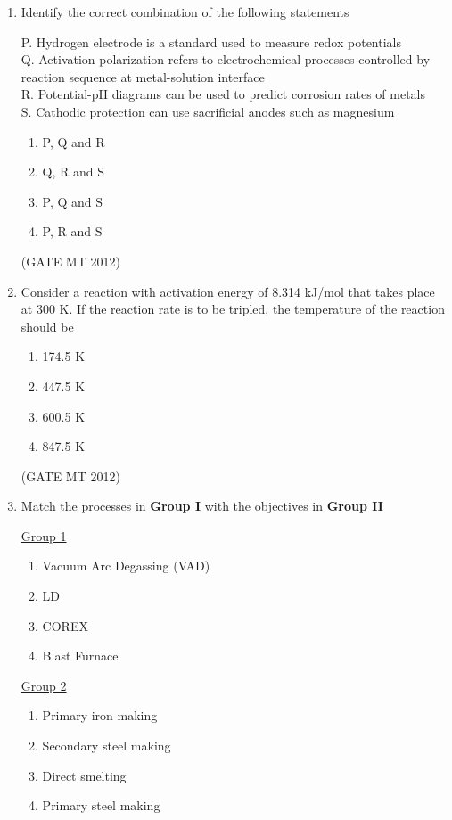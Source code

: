 \documentclass[journal, 11pt, onecolumn]{IEEEtran}
\theoremstyle{remark}
\begin{document}
\begin{enumerate}
\begin{enumerate}
\item Identify the correct combination of the following statements

P. Hydrogen electrode is a standard used to measure redox potentials \\
Q. Activation polarization refers to electrochemical processes controlled by reaction sequence at metal-solution interface \\
R. Potential-pH diagrams can be used to predict corrosion rates of metals \\
S. Cathodic protection can use sacrificial anodes such as magnesium

\begin{multicols}{2}
\begin{enumerate}  
\item P, Q and R
\item Q, R and S
\item P, Q and S
\item P, R and S
\end{enumerate}
\end{multicols}
\hfill(GATE MT 2012)

\item Consider a reaction with activation energy of 8.314 kJ/mol that takes place at 300 K. If the reaction rate is to be tripled, the temperature of the reaction should be

\begin{multicols}{2}
\begin{enumerate}  
\item 174.5 K
\item 447.5 K
\item 600.5 K
\item 847.5 K
\end{enumerate}
\end{multicols}
\hfill(GATE MT 2012)

\item Match the processes in \textbf{Group I} with the objectives in \textbf{Group II}
\begin{multicols}{2}
\underline{Group 1}
\begin{enumerate}[label=(\Alph*), start=16]
\item Vacuum Arc Degassing (VAD)  
\item LD
\item COREX 
\item Blast Furnace
\end{enumerate}

\underline{Group 2}
\begin{enumerate}[label=(\arabic*), start=1]
\item Primary iron making 
\item Secondary steel making 
\item Direct smelting
\item Primary steel making 
\end{enumerate}
\end{multicols}


\end{enumerate}
\end{enumerate}
\end{document}
